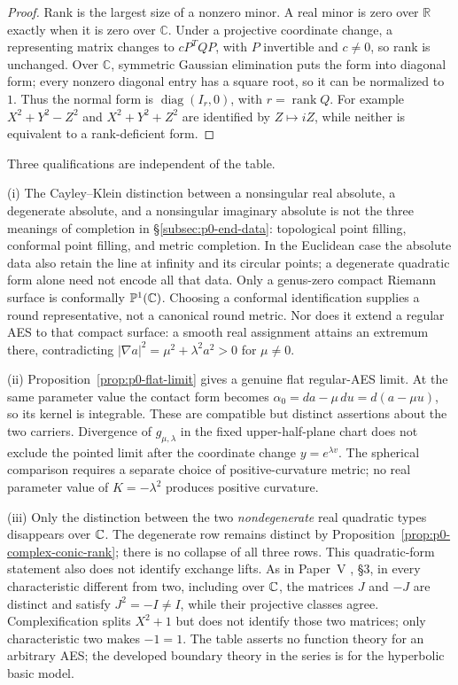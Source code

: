 \begin{proof}
Rank is the largest size of a nonzero minor.  A real minor is zero over
$\mathbb R$ exactly when it is zero over $\mathbb C$.  Under a projective
coordinate change, a representing matrix changes to $cP^TQP$, with $P$
invertible and $c\ne0$, so rank is unchanged.  Over $\mathbb C$, symmetric
Gaussian elimination puts the form into diagonal form; every nonzero diagonal
entry has a square root, so it can be normalized to $1$.  Thus the normal
form is $\operatorname{diag}(I_r,0)$, with $r=\operatorname{rank}Q$.
For example $X^2+Y^2-Z^2$ and $X^2+Y^2+Z^2$ are identified by
$Z\mapsto iZ$, while neither is equivalent to a rank-deficient form.
\end{proof}

\begin{remark}\label{rem:p0-three-models}
Three qualifications are independent of the table.

(i) The Cayley--Klein distinction between a nonsingular real absolute, a
degenerate absolute, and a nonsingular imaginary absolute is not the three
meanings of completion in \S\ref{subsec:p0-end-data}: topological point
filling, conformal point filling, and metric completion.  In the Euclidean
case the absolute data also retain the line at infinity and its circular
points; a degenerate quadratic form alone need not encode all that data.
Only a genus-zero compact Riemann surface is conformally $\mathbb{P}^1(\mathbb{C})$.
Choosing a conformal identification supplies a round representative, not a
canonical round metric.  Nor does it extend a regular AES to that compact
surface: a smooth real assignment attains an extremum there, contradicting
$|\nabla a|^2=\mu^2+\lambda^2a^2>0$ for $\mu\ne0$.

(ii) Proposition~\ref{prop:p0-flat-limit} gives a genuine flat regular-AES
limit.  At the same parameter value the contact form becomes
$\alpha_0=da-\mu\,du=d(a-\mu u)$, so its kernel is integrable.  These are
compatible but distinct assertions about the two carriers.  Divergence of
$g_{\mu,\lambda}$ in the fixed upper-half-plane chart does not exclude the
pointed limit after the coordinate change $y=e^{\lambda v}$.  The spherical
comparison requires a separate choice of positive-curvature metric; no real
parameter value of $K=-\lambda^2$ produces positive curvature.

(iii) Only the distinction between the two \emph{nondegenerate} real
quadratic types disappears over $\mathbb{C}$.  The degenerate row remains distinct
by Proposition~\ref{prop:p0-complex-conic-rank}; there is no collapse of all
three rows.  This quadratic-form statement also does not identify exchange
lifts.  As in Paper~V \cite{Yuan2026AEGTriadic}, \S3, in every characteristic
different from two, including over $\mathbb{C}$, the matrices $J$ and $-J$ are
distinct and satisfy $J^2=-I\ne I$, while their projective classes agree.
Complexification splits $X^2+1$ but does not identify those two matrices;
only characteristic two makes $-1=1$.  The table asserts no function theory
for an arbitrary AES; the developed boundary theory in the series is for the
hyperbolic basic model.
\end{remark}
